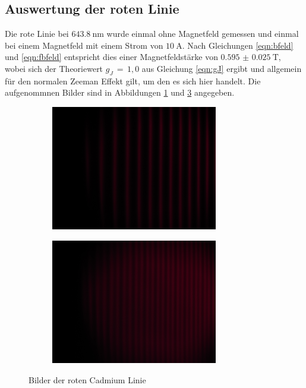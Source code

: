 \subsection{Auswertung der roten Linie}
Die rote Linie bei $\SI{643.8}{\nano\meter}$  wurde einmal ohne Magnetfeld gemessen und einmal
bei einem Magnetfeld mit einem Strom von $\SI{10}{\ampere}$. Nach Gleichungen
\ref{eqn:bfeld} und \ref{eqn:fbfeld} entspricht dies einer Magnetfeldstärke von $\SI{0.595(25)}{\tesla}$,
wobei sich der Theoriewert $g_J\,=\,1,0$ aus Gleichung \ref{eqn:gJ} ergibt und allgemein für den normalen Zeeman
Effekt gilt, um den es sich hier handelt.
Die aufgenommnen Bilder sind in Abbildungen \ref{fig:rot1} und \ref{fig:rot2} angegeben.
\begin{figure}
\begin{subfigure}[c]{0.5\textwidth}

\includegraphics[width=0.8\textwidth]{Rot1.JPG}
\label{fig:rot1}
\end{subfigure}
\begin{subfigure}[c]{0.5\textwidth}
\includegraphics[width=0.8\textwidth]{Rot2.JPG}
\label{fig:rot2}
\end{subfigure}
\caption{Bilder der roten Cadmium Linie}
\end{figure}

